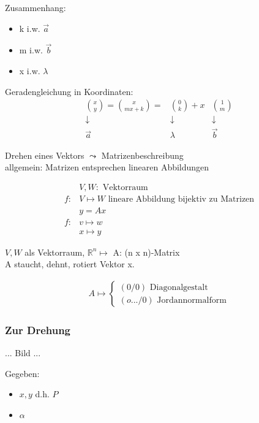 Zusammenhang:

\begin{itemize}
	\item k i.w. $\vec{a}$
	\item m i.w. $\vec{b}$
	\item x i.w. $\lambda$
\end{itemize}

Geradengleichung in Koordinaten:
\begin{align*} %
	\binom{x}{y} = \binom{x}{mx+k} = &\binom{0}{k} + x& \binom{1}{m} \\
	\downarrow& \downarrow& \downarrow \\
	\vec{a}& \lambda& \vec{b}
\end{align*}



Drehen eines Vektors $\leadsto$ Matrizenbeschreibung \\

allgemein: Matrizen entsprechen linearen Abbildungen

\begin{align*}
&V, W: \text{ Vektorraum} \\
f: &V \mapsto W  \text{ lineare Abbildung bijektiv zu Matrizen} \\
&y = Ax \\
f: &v \mapsto w \\
&x \mapsto y
\end{align*}

$V, W$ als Vektorraum, $\mathbb{R}^{n} \mapsto$ A: (n x n)-Matrix \\
A staucht, dehnt, rotiert Vektor x.

\begin{align*}
A \mapsto 	\begin{cases} 
			(0 / 0) \text{ Diagonalgestalt} \\
			(o.../0) \text{ Jordannormalform}
		\end{cases}
\end{align*}

\subsubsection*{Zur Drehung}

... Bild ...

Gegeben:
\begin{itemize}
	\item $x, y$ d.h. $P$
	\item $\alpha$
\end{itemize}


